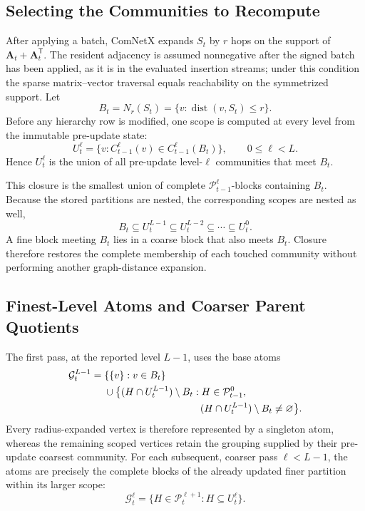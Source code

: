 \documentclass{ieeeaccess}
\begin{document}
\subsection{Selecting the Communities to Recompute}

After applying a batch, ComNetX expands $S_t$ by $r$ hops on the support of
$\bm{A}_t+\bm{A}_t^{\mathsf T}$. The resident adjacency is assumed
nonnegative after the signed batch has been applied, as it is in the evaluated
insertion streams; under this condition the sparse matrix--vector traversal
equals reachability on the symmetrized support. Let
\begin{equation}
B_t=N_r(S_t)=\{v:\operatorname{dist}(v,S_t)\le r\}.
\label{eq:radius}
\end{equation}
Before any hierarchy row is modified, one scope is computed at every level
from the immutable pre-update state:
\begin{equation}
U_t^\ell=\{v:C_{t-1}^\ell(v)\in
C_{t-1}^\ell(B_t)\},\qquad 0\le\ell<L.
\label{eq:closure}
\end{equation}
Hence $U_t^\ell$ is the union of all pre-update level-$\ell$ communities that
meet $B_t$.

This closure is the smallest union of complete
$\mathcal{P}_{t-1}^\ell$-blocks containing $B_t$. Because the stored
partitions are nested, the corresponding scopes are nested as well,
\begin{equation}
B_t\subseteq U_t^{L-1}\subseteq U_t^{L-2}\subseteq\cdots\subseteq U_t^0.
\label{eq:nested_closures}
\end{equation}
A fine block meeting $B_t$ lies in a coarse block that also meets $B_t$.
Closure therefore restores the complete membership of each touched community
without performing another graph-distance expansion.

\subsection{Finest-Level Atoms and Coarser Parent Quotients}

The first pass, at the reported level $L-1$, uses the base atoms
\begin{equation}
\begin{aligned}
\mathcal{G}_t^{L-1}={}&\{\{v\}:v\in B_t\}\\
&{}\cup\bigl\{(H\cap U_t^{L-1})\setminus B_t:
H\in\mathcal{P}_{t-1}^{0},\\
&\hspace{34mm}(H\cap U_t^{L-1})\setminus B_t\ne\varnothing\bigr\}.
\end{aligned}
\label{eq:base_atoms}
\end{equation}
Every radius-expanded vertex is therefore represented by a singleton atom,
whereas the remaining scoped vertices retain the grouping supplied by their
pre-update coarsest community.
For each subsequent, coarser pass $\ell<L-1$, the atoms are precisely the
complete blocks of the already updated finer partition within its larger
scope:
\begin{equation}
\mathcal{G}_t^\ell=
\{H\in\mathcal{P}_t^{\ell+1}:H\subseteq U_t^\ell\}.
\label{eq:parent_atoms}
\end{equation}
\end{document}
